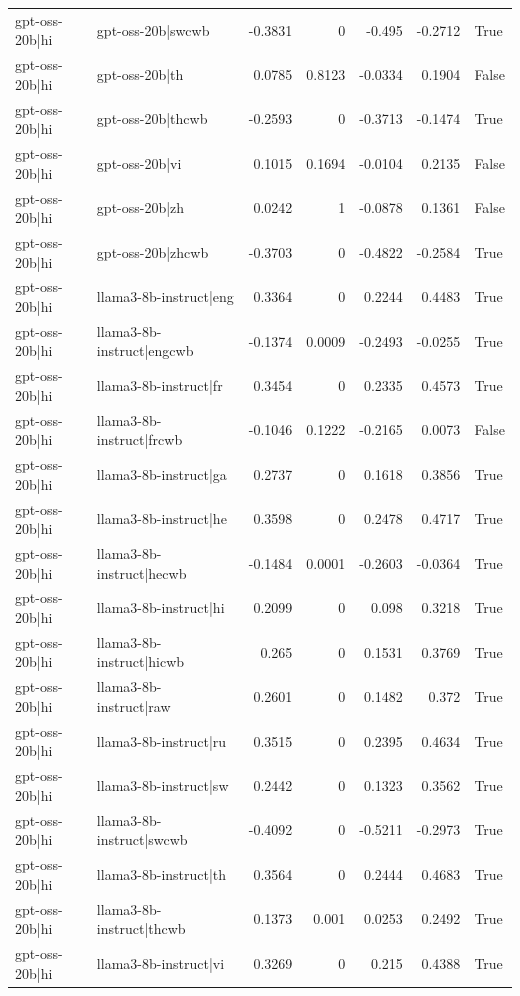 \begin{table}
\begin{tabular}{l l r r r r l}
gpt-oss-20b|hi & gpt-oss-20b|swcwb & -0.3831 & 0 & -0.495 & -0.2712 & True \\
gpt-oss-20b|hi & gpt-oss-20b|th & 0.0785 & 0.8123 & -0.0334 & 0.1904 & False \\
gpt-oss-20b|hi & gpt-oss-20b|thcwb & -0.2593 & 0 & -0.3713 & -0.1474 & True \\
gpt-oss-20b|hi & gpt-oss-20b|vi & 0.1015 & 0.1694 & -0.0104 & 0.2135 & False \\
gpt-oss-20b|hi & gpt-oss-20b|zh & 0.0242 & 1 & -0.0878 & 0.1361 & False \\
gpt-oss-20b|hi & gpt-oss-20b|zhcwb & -0.3703 & 0 & -0.4822 & -0.2584 & True \\
gpt-oss-20b|hi & llama3-8b-instruct|eng & 0.3364 & 0 & 0.2244 & 0.4483 & True \\
gpt-oss-20b|hi & llama3-8b-instruct|engcwb & -0.1374 & 0.0009 & -0.2493 & -0.0255 & True \\
gpt-oss-20b|hi & llama3-8b-instruct|fr & 0.3454 & 0 & 0.2335 & 0.4573 & True \\
gpt-oss-20b|hi & llama3-8b-instruct|frcwb & -0.1046 & 0.1222 & -0.2165 & 0.0073 & False \\
gpt-oss-20b|hi & llama3-8b-instruct|ga & 0.2737 & 0 & 0.1618 & 0.3856 & True \\
gpt-oss-20b|hi & llama3-8b-instruct|he & 0.3598 & 0 & 0.2478 & 0.4717 & True \\
gpt-oss-20b|hi & llama3-8b-instruct|hecwb & -0.1484 & 0.0001 & -0.2603 & -0.0364 & True \\
gpt-oss-20b|hi & llama3-8b-instruct|hi & 0.2099 & 0 & 0.098 & 0.3218 & True \\
gpt-oss-20b|hi & llama3-8b-instruct|hicwb & 0.265 & 0 & 0.1531 & 0.3769 & True \\
gpt-oss-20b|hi & llama3-8b-instruct|raw & 0.2601 & 0 & 0.1482 & 0.372 & True \\
gpt-oss-20b|hi & llama3-8b-instruct|ru & 0.3515 & 0 & 0.2395 & 0.4634 & True \\
gpt-oss-20b|hi & llama3-8b-instruct|sw & 0.2442 & 0 & 0.1323 & 0.3562 & True \\
gpt-oss-20b|hi & llama3-8b-instruct|swcwb & -0.4092 & 0 & -0.5211 & -0.2973 & True \\
gpt-oss-20b|hi & llama3-8b-instruct|th & 0.3564 & 0 & 0.2444 & 0.4683 & True \\
gpt-oss-20b|hi & llama3-8b-instruct|thcwb & 0.1373 & 0.001 & 0.0253 & 0.2492 & True \\
gpt-oss-20b|hi & llama3-8b-instruct|vi & 0.3269 & 0 & 0.215 & 0.4388 & True \\

\end{tabular}
\end{table}
